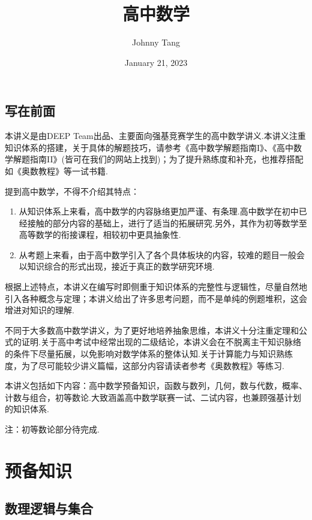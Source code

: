 \documentclass[lang=cn, zihao=5]{elegantbook}
\title{高中数学}
\author{Johnny Tang}
\institute{DEEP Team}
\date{January 21, 2023}
\begin{document}
\maketitle

\frontmatter

\mainmatter

\chapter*{写在前面}

本讲义是由DEEP Team出品、主要面向强基竞赛学生的高中数学讲义.本讲义注重知识体系的搭建，关于具体的解题技巧，请参考《高中数学解题指南I》、《高中数学解题指南II》(皆可在我们的网站上找到)；为了提升熟练度和补充，也推荐搭配如《奥数教程》等一试书籍.

提到高中数学，不得不介绍其特点：
\begin{enumerate}
	\item 从知识体系上来看，高中数学的内容脉络更加严谨、有条理.高中数学在初中已经接触的部分内容的基础上，进行了适当的拓展研究.另外，其作为初等数学至高等数学的衔接课程，相较初中更具抽象性.
	\item 从考题上来看，由于高中数学引入了各个具体板块的内容，较难的题目一般会以知识综合的形式出现，接近于真正的数学研究环境.
\end{enumerate}
根据上述特点，本讲义在编写时即侧重于知识体系的完整性与逻辑性，尽量自然地引入各种概念与定理；本讲义给出了许多思考问题，而不是单纯的例题堆积，这会增进对知识的理解.

不同于大多数高中数学讲义，为了更好地培养抽象思维，本讲义十分注重定理和公式的证明.关于高中考试中经常出现的二级结论，本讲义会在不脱离主干知识脉络的条件下尽量拓展，以免影响对数学体系的整体认知.关于计算能力与知识熟练度，为了尽可能较少讲义篇幅，这部分内容请读者参考《奥数教程》等练习.

本讲义包括如下内容：高中数学预备知识，函数与数列，几何，数与代数，概率、计数与组合，初等数论.大致涵盖高中数学联赛一试、二试内容，也兼顾强基计划的知识体系.

\tableofcontents

注：初等数论部分待完成.

\newpage

\part{预备知识}

\setcounter{chapter}{-1}
\chapter{数理逻辑与集合}
\end{document}
